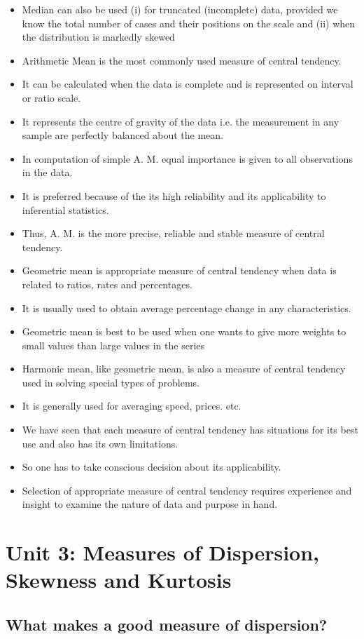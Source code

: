 \documentclass[
10pt, %
a4paper, %
]{report}
\begin{document}
\begin{itemize}
\item Median can also be used (i) for truncated (incomplete) data, provided we know the total number of cases and their positions on the scale and (ii) when the distribution is markedly skewed
\item Arithmetic Mean is the most commonly used measure of central tendency.
\item It can be calculated when the data is complete and is represented on interval or ratio scale.
\item It represents the centre of gravity of the data i.e. the measurement in any sample are perfectly balanced about the mean.
\item In computation of simple A. M. equal importance is given to all observations in the data.
\item It is preferred because of the its high reliability and its applicability to inferential statistics.
\item Thus, A. M. is the more precise, reliable and stable measure of central tendency.
\item Geometric mean is appropriate measure of central tendency when data is related to ratios, rates and percentages.
\item It is usually used to obtain average percentage change in any characteristics.
\item Geometric mean is best to be used when one wants to give more weights to small values than large values in the series
\item Harmonic mean, like geometric mean, is also a measure of central tendency used in solving special types of problems.
\item It is generally used for averaging speed, prices. etc.
\item We have seen that each measure of central tendency has situations for its best use and also has its own limitations.
\item So one has to take conscious decision about its applicability.
\item Selection of appropriate measure of central tendency requires experience and insight to examine the nature of data and purpose in hand.
\end{itemize}

\chapter*{Unit 3: Measures of Dispersion, Skewness and Kurtosis}

\section*{What makes a good measure of dispersion?}
\end{document}
